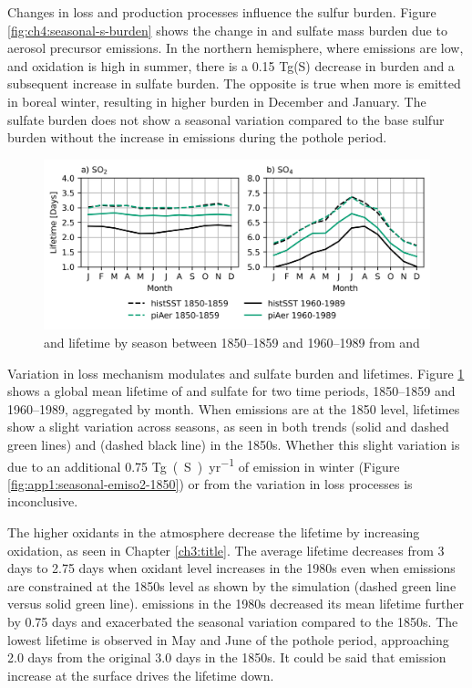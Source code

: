 Changes in loss and production processes influence the sulfur burden. Figure \ref{fig:ch4:seasonal-s-burden} shows the change in  and sulfate mass burden due to aerosol precursor emissions. In the northern hemisphere, where emissions are low, and oxidation is high in summer, there is a 0.15 Tg(S) decrease in  burden and a subsequent increase in sulfate burden. The opposite is true when more  is emitted in boreal winter, resulting in higher  burden in December and January. The sulfate burden does not show a seasonal variation compared to the base sulfur burden without the increase in  emissions during the pothole period.

\begin{figure}
    \centering
    \includegraphics{Chapter4/Figs/lifetime_pothole.png}
    \caption[ and  lifetime by season between 1980 and 1989]{ and  lifetime by season between 1850--1859 and 1960--1989 from \histsst{} and \sstpiaer{}}
    \label{fig:ch4:seasonal-s-lifetime}
\end{figure}

Variation in loss mechanism modulates  and sulfate burden and lifetimes. Figure \ref{fig:ch4:seasonal-s-lifetime} shows a global mean lifetime of  and sulfate for two time periods, 1850--1859 and 1960--1989, aggregated by month. When  emissions are at the 1850 level,  lifetimes show a slight variation across seasons, as seen in both \sstpiaer{} trends (solid and dashed green lines) and \histsst{} (dashed black line) in the 1850s. Whether this slight variation is due to an additional 0.75 \unit{Tg(S)~yr^{-1}} of emission in winter (Figure \ref{fig:app1:seasonal-emiso2-1850}) or from the variation in loss processes is inconclusive. 

The higher oxidants in the atmosphere decrease the  lifetime by increasing oxidation, as seen in Chapter \ref{ch3:title}. The average  lifetime decreases from 3 days to 2.75 days when oxidant level increases in the 1980s even when  emissions are constrained at the 1850s level as shown by the \sstpiaer{} simulation (dashed green line versus solid green line).  emissions in the 1980s decreased its mean lifetime further by 0.75 days and exacerbated the seasonal variation compared to the 1850s. The lowest  lifetime is observed in May and June of the pothole period, approaching 2.0 days from the original 3.0 days in the 1850s. It could be said that  emission increase at the surface drives the lifetime down. 

